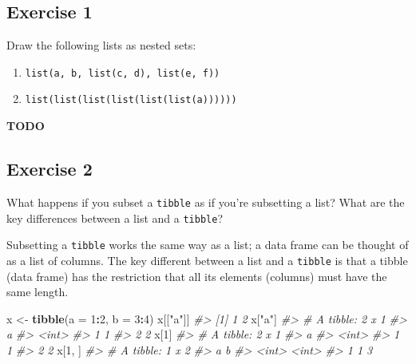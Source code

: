 \documentclass[]{book}
\newenvironment{Shaded}{\begin{snugshade}}{\end{snugshade}}
\newcommand{\CommentTok}[1]{\textcolor[rgb]{0.56,0.35,0.01}{\textit{#1}}}
\newcommand{\DataTypeTok}[1]{\textcolor[rgb]{0.13,0.29,0.53}{#1}}
\newcommand{\DecValTok}[1]{\textcolor[rgb]{0.00,0.00,0.81}{#1}}
\newcommand{\KeywordTok}[1]{\textcolor[rgb]{0.13,0.29,0.53}{\textbf{#1}}}
\newcommand{\NormalTok}[1]{#1}
\newcommand{\OperatorTok}[1]{\textcolor[rgb]{0.81,0.36,0.00}{\textbf{#1}}}
\newcommand{\StringTok}[1]{\textcolor[rgb]{0.31,0.60,0.02}{#1}}
\providecommand{\tightlist}{%
  \setlength{\itemsep}{0pt}\setlength{\parskip}{0pt}}
\theoremstyle{definition}
\theoremstyle{definition}
\theoremstyle{definition}
\theoremstyle{remark}
\begin{document}
\hypertarget{exercise-1-50}{%
\subsection{Exercise 1}\label{exercise-1-50}}

Draw the following lists as nested sets:

\begin{enumerate}
\def\labelenumi{\arabic{enumi}.}
\tightlist
\item
  \texttt{list(a,\ b,\ list(c,\ d),\ list(e,\ f))}
\item
  \texttt{list(list(list(list(list(list(a))))))}
\end{enumerate}

\textbf{TODO}

\hypertarget{exercise-2-49}{%
\subsection{Exercise 2}\label{exercise-2-49}}

What happens if you subset a \texttt{tibble} as if you're subsetting a
list? What are the key differences between a list and a \texttt{tibble}?

Subsetting a \texttt{tibble} works the same way as a list; a data frame
can be thought of as a list of columns. The key different between a list
and a \texttt{tibble} is that a tibble (data frame) has the restriction
that all its elements (columns) must have the same length.

\begin{Shaded}
\begin{Highlighting}[]
\NormalTok{x <-}\StringTok{ }\KeywordTok{tibble}\NormalTok{(}\DataTypeTok{a =} \DecValTok{1}\OperatorTok{:}\DecValTok{2}\NormalTok{, }\DataTypeTok{b =} \DecValTok{3}\OperatorTok{:}\DecValTok{4}\NormalTok{)}
\NormalTok{x[[}\StringTok{"a"}\NormalTok{]]}
\CommentTok{#> [1] 1 2}
\NormalTok{x[}\StringTok{"a"}\NormalTok{]}
\CommentTok{#> # A tibble: 2 x 1}
\CommentTok{#>       a}
\CommentTok{#>   <int>}
\CommentTok{#> 1     1}
\CommentTok{#> 2     2}
\NormalTok{x[}\DecValTok{1}\NormalTok{]}
\CommentTok{#> # A tibble: 2 x 1}
\CommentTok{#>       a}
\CommentTok{#>   <int>}
\CommentTok{#> 1     1}
\CommentTok{#> 2     2}
\NormalTok{x[}\DecValTok{1}\NormalTok{, ]}
\CommentTok{#> # A tibble: 1 x 2}
\CommentTok{#>       a     b}
\CommentTok{#>   <int> <int>}
\CommentTok{#> 1     1     3}
\end{Highlighting}
\end{Shaded}
\end{document}
